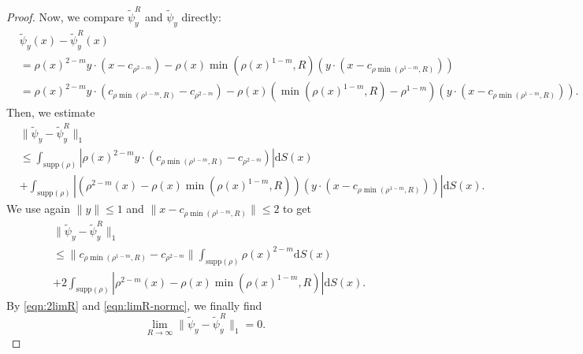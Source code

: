 \documentclass[10pt,a4paper]{amsart}
\newcommand{\dx}{\mathrm{d}S (x)}
\newcommand{\supp}{\mathrm{supp}(\rho)}
\begin{document}
\begin{proof}
Now, we compare $\tilde{\psi}_y^R$ and $\tilde{\psi}_y$ directly:
\begin{align*}
&\tilde{\psi}_y(x)-\tilde{\psi}_y^R(x)\\[2pt]
&=\rho(x)^{2-m}y\cdot(x-c_{\rho^{2-m}})-\rho(x)\min(\rho(x)^{1-m}, R)\left(y\cdot\left(x-c_{\rho\min(\rho^{1-m}, R)}\right)\right)\\[2pt]
&=\rho(x)^{2-m}y\cdot(c_{\rho\min(\rho^{1-m},R)}-c_{\rho^{2-m}})-\rho(x)\left(\min(\rho(x)^{1-m}, R)-\rho^{1-m}\right)\left(y\cdot\left(x-c_{\rho\min(\rho^{1-m}, R)}\right)\right).
\end{align*}
Then, we estimate
\begin{align*}
&\|\tilde{\psi}_y-\tilde{\psi}_y^R\|_{1}\\
&\leq\int_{\supp}|\rho(x)^{2-m}y\cdot (c_{\rho\min(\rho^{1-m}, R)}-c_{\rho^{2-m}})|\dx\\
&+\int_{\supp}|(\rho^{2-m}(x)-\rho(x)\min(\rho(x)^{1-m},R))( y\cdot(x-c_{\rho\min(\rho^{1-m}, R)}))|\dx.
\end{align*}
We use again $\|y\|\leq1$ and $\|x-c_{\rho\min(\rho^{1-m},R)}\|\leq2$ to get
\begin{align*}
&\|\tilde{\psi}_y-\tilde{\psi}_y^R\|_{1}\\
&\leq \|c_{\rho\min(\rho^{1-m},R)}-c_{\rho^{2-m}}\|\int_{\supp}\rho(x)^{2-m}\dx\\
&+2\int_{\supp}|\rho^{2-m}(x)-\rho(x)\min(\rho(x)^{1-m},R)|\dx.
\end{align*}
By \eqref{eqn:2limR} and \eqref{eqn:limR-normc}, we finally find
\begin{equation}
\label{eqn:limphi-L1}
\lim_{R\to\infty}\|\tilde{\psi}_y-\tilde{\psi}_y^R\|_{1}=0.
\end{equation}


\end{proof}
\end{document}
